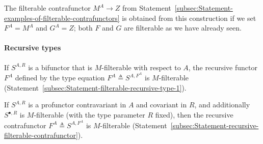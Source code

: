 The filterable contrafunctor $M^{A}\rightarrow Z$ from Statement~\ref{subsec:Statement-examples-of-filterable-contrafunctors}
is obtained from this construction if we set $F^{A}=M^{A}$ and $G^{A}=Z$;
both $F$ and $G$ are filterable as we have already seen.

\paragraph{Recursive types}

If $S^{A,R}$ is a bifunctor that is $M$-filterable with respect
to $A$, the recursive functor $F^{A}$ defined by the type equation
$F^{A}\triangleq S^{A,F^{A}}$ is $M$-filterable (Statement~\ref{subsec:Statement-filterable-recursive-type-1}).

If $S^{A,R}$ is a profunctor contravariant in
$A$ and covariant in $R$, and additionally $S^{\bullet,R}$ is $M$-filterable
(with the type parameter $R$ fixed), then the recursive contrafunctor
$F^{A}\triangleq S^{A,F^{A}}$ is $M$-filterable (Statement~\ref{subsec:Statement-recursive-filterable-contrafunctor}).

